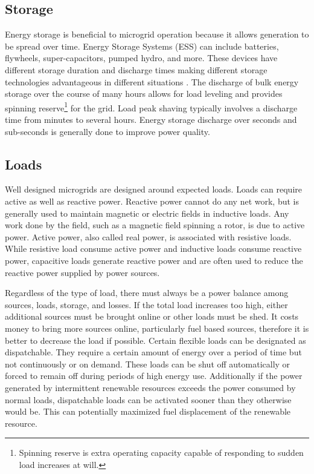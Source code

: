 \subsection{Storage}
Energy storage is beneficial to microgrid operation because it allows generation to be spread over time. Energy Storage Systems (ESS) can include batteries, flywheels, super-capacitors, pumped hydro, and more. These devices have different storage duration and discharge times making different storage technologies advantageous in different situations \cite{Schoenung2003}. The discharge of bulk energy storage over the course of many hours allows for load leveling and provides spinning reserve\footnote{Spinning reserve is extra operating capacity capable of responding to sudden load increases at will.} for the grid. Load peak shaving typically involves a discharge time from minutes to several hours. Energy storage discharge over seconds and sub-seconds is generally done to improve power quality.

\subsection{Loads}
Well designed microgrids are designed around expected loads. Loads can require active as well as reactive power. Reactive power cannot do any net work, but is generally used to maintain magnetic or electric fields in inductive loads. Any work done by the field, such as a magnetic field spinning a rotor, is due to active power. Active power, also called real power, is associated with resistive loads. While resistive load consume active power and inductive loads consume reactive power, capacitive loads generate reactive power and are often used to reduce the reactive power supplied by power sources. 

Regardless of the type of load, there must always be a power balance among sources, loads, storage, and losses. If the total load increases too high,  either additional sources must be brought online or other loads must be shed. It costs money to bring more sources online, particularly fuel based sources, therefore it is better to decrease the load if possible. Certain flexible loads can be designated as dispatchable. They require a certain amount of energy over a period of time but not continuously or on demand. These loads can be shut off automatically or forced to remain off during periods of high energy use. Additionally if the power generated by intermittent renewable resources exceeds the power consumed by normal loads, dispatchable loads can be activated sooner than they otherwise would be. This can potentially maximized fuel displacement of the renewable resource.  

